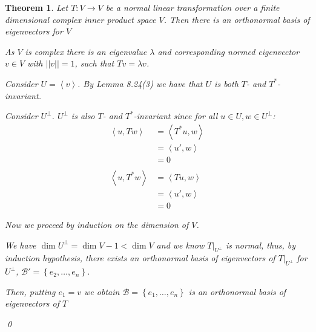 \documentclass[11pt, a4paper]{report}
\makeatletter
\numberwithin{equation}{section}
\newcommand{\B}{\mathcal{B}}
\newcommand{\spn}[1]{\left\langle #1 \right\rangle}
\newcommand{\sett}[1]{\left\lbrace #1 \right\rbrace}
\numberwithin{equation}{subsection}
\theoremstyle{plain}
\newtheorem{thm}{Theorem}[chapter] %
\theoremstyle{definition}
\theoremstyle{remark}
\newtheorem*{prf}{Proof}
\renewenvironment{prf}[1][\proofname]{\par
  \vspace{-\topsep}%
  \normalfont
  \topsep0pt \partopsep0pt %
  \trivlist
  \item[\hskip\labelsep
        \itshape
    #1\@addpunct{.}]\ignorespaces
}{%
  \popQED\endtrivlist\@endpefalse
  \addvspace{6pt plus 6pt} %
}
\newcommand{\pr}[1]{\begin{adjustwidth}{1cm}{} \begin{prf} #1 \end{prf} \end{adjustwidth}}
\makeatother
\begin{document}
\newpage

\begin{thm}
Let $T: V \to V$ be a normal linear transformation over a finite dimensional complex inner product space $V$. Then there is an orthonormal basis of eigenvectors for $V$
\pr{
As $V$ is complex there is an eigenvalue $\lambda$ and corresponding normed eigenvector $v \in V$ with $||v|| = 1$, such that $Tv = \lambda v$.

Consider $U = \spn{v}$. By Lemma 8.24(3) we have that $U$ is both $T$- and $T^*$- invariant.

Consider $U^\perp$. $U^\perp$ is also $T$- and $T^*$-invariant since for all $u \in U, w \in U^\perp$:
\begin{align*}
\spn{u, Tw} &= \spn{T^*u, w}\\
			&= \spn{u', w} \tag{for some $u' \in U$ since $U$ is $T^*$ invariant}\\
			&= 0\\\\
\spn{u, T^*w}	&= \spn{Tu, w}\\
				&= \spn{u', w}\\
				&= 0
\end{align*} 

Now we proceed by induction on the dimension of $V$.

We have $\dim U^\perp = \dim V - 1 < \dim V$ and we know $T|_{U^\perp}$ is normal, thus, by induction hypothesis, there exists an orthonormal basis of eigenvectors of $T|_{U^\perp}$ for $U^\perp$, $\B' = \sett{e_2, \ldots, e_n}$.

Then, putting $e_1 = v$ we obtain $\B =\sett{e_1, \ldots, e_n}$ is an orthonormal basis of eigenvectors of $T$
}\qed
\end{thm}
\end{document}
